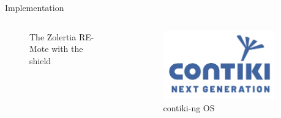\begin{frame}{Implementation}
\begin{columns}
\begin{column}{0.4\textwidth}
\begin{figure}[H]
    \caption{The Zolertia RE-Mote with the shield\label{fig:zolpic}}
\end{figure}
\end{column}
\begin{column}{0.2\textwidth}
\begin{figure}[H]
    \centering
    \includegraphics[width=0.9\textwidth]{presentation.tex/fig/contiki.png}
    \caption{contiki-ng OS}
\end{figure}
\end{column}
\end{columns}
\end{frame}

